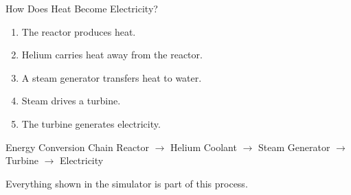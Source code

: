 \documentclass[aspectratio=169]{beamer}
\begin{document}
\begin{frame}{How Does Heat Become Electricity?}

\begin{enumerate}
\item The reactor produces heat.
\item Helium carries heat away from the reactor.
\item A steam generator transfers heat to water.
\item Steam drives a turbine.
\item The turbine generates electricity.
\end{enumerate}

\vspace{0.5cm}

\begin{block}{Energy Conversion Chain}
Reactor $\rightarrow$ Helium Coolant $\rightarrow$ Steam Generator
$\rightarrow$ Turbine $\rightarrow$ Electricity
\end{block}

\vspace{0.3cm}

Everything shown in the simulator is part of this process.

\end{frame}
\end{document}
